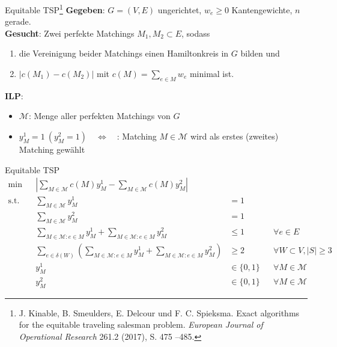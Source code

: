 \documentclass[ngerman,aspectratio=169,10pt]{beamer}
\begin{document}
\begin{frame}{Equitable TSP\footnote{J. Kinable, B. Smeulders, E. Delcour und F. C. Spieksma. Exact algorithms for the equitable traveling salesman problem. \emph{European Journal of Operational Research} 261.2 (2017), S. 475 –485.}}
	\textbf{Gegeben}: $G=(V,E)$ ungerichtet, $w_e\geq0$ Kantengewichte, $n$ gerade.\\
	\textbf{Gesucht}: Zwei perfekte Matchings $M_1,M_2\subset E$, sodass
	\begin{enumerate}
		\item die Vereinigung beider Matchings einen Hamiltonkreis in $G$ bilden und
		\item $|c(M_1)-c(M_2)|$ mit $c(M)=\sum_{e\in M}w_e$ minimal ist.
	\end{enumerate}

	\textbf{ILP}:
	\begin{itemize}
		\item $\mathcal{M}$: Menge aller perfekten Matchings von $G$
		\item $y_M^1=1~(y_M^2=1)\quad\Leftrightarrow\quad$: Matching $M\in\mathcal{M}$ wird als erstes (zweites) Matching gewählt
	\end{itemize}

	
\end{frame}
\begin{frame}{Equitable TSP}
   \begin{align*}
   \min    && \left|\sum_{M\in\mathcal{M}}c(M)y_M^1-\sum_{M\in\mathcal{M}}c(M)y_M^2\right|\\
   \text{s.t.} && \sum_{M\in\mathcal{M}}y_M^1 &=1&&\\
   && \sum_{M\in\mathcal{M}}y_M^2 &=1&&\\
   && \sum_{M\in\mathcal{M}:e\in M}y_M^1+\sum_{M\in\mathcal{M}:e\in M}y_M^2 &\leq1 &&\forall e\in E\\
   && \sum_{e\in\delta(W)}\left(\sum_{M\in\mathcal{M}:e\in M}y_M^1+\sum_{M\in\mathcal{M}:e\in M}y_M^2\right) &\geq 2 &&\forall W\subset V, |S| \geq 3\\
   && y_M^1 &\in\{0,1\} &&\forall M\in\mathcal{M}\\
   && y_M^2 &\in\{0,1\} &&\forall M\in\mathcal{M}
   \end{align*}
\end{frame}
\end{document}
